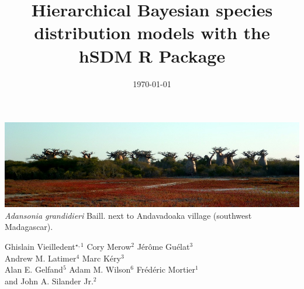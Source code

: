 \documentclass[a4paper, 12pt, leqno]{article}\usepackage[]{graphicx}\usepackage[]{color}
\title{Hierarchical Bayesian species distribution models with the \textbf{hSDM} R Package}
\date{\today}
\author{}
\begin{document}
\maketitle
\vspace{-1cm}
\begin{center}
  \includegraphics[width=\textwidth]{header.jpg}\\
  \textit{Adansonia grandidieri} Baill. next to Andavadoaka village (southwest Madagascar).
\end{center}

\vspace{0.5cm}

\begin{center}
  \large{
    Ghislain Vieilledent$^{\star,1}$ \hspace{0.75cm} Cory Merow$^{2}$ \hspace{0.75cm} Jérôme
    Guélat$^{3}$ \\
    \vspace{0.25cm}
    Andrew M. Latimer$^{4}$ \hspace{0.75cm} Marc Kéry$^{3}$ \\ 
    \vspace{0.25cm}
    Alan E. Gelfand$^{5}$ \hspace{0.75cm} Adam M. Wilson$^{6}$ \hspace{0.75cm}
    Frédéric Mortier$^{1}$ \\
    \vspace{0.25cm} and \hspace{0.75cm} John A. Silander Jr.$^{2}$
  }
\end{center}

\vspace{0.5cm}

\end{document}

